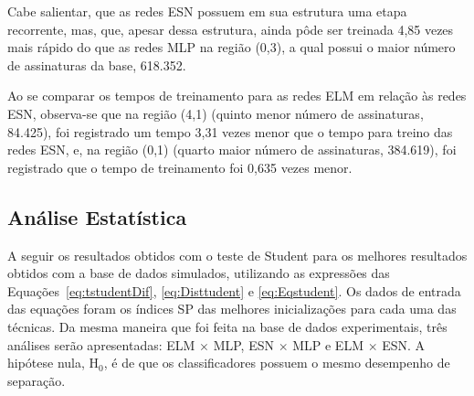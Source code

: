 Cabe salientar, que as redes ESN possuem em sua estrutura uma etapa recorrente, mas, que, apesar dessa estrutura, ainda pôde ser treinada 4,85 vezes mais rápido do que as redes MLP na região (0,3), a qual possui o maior número de assinaturas da base, 618.352.

%
%
%
%

Ao se comparar os tempos de treinamento para as redes ELM em relação às redes ESN, observa-se que na região (4,1) (quinto menor número de assinaturas, 84.425), foi registrado um tempo 3,31 vezes menor que o tempo para treino das redes ESN, e, na região (0,1) (quarto maior número de assinaturas, 384.619), foi registrado que o tempo de treinamento foi 0,635 vezes menor.

\subsection{Análise Estatística}



A seguir os resultados obtidos com o teste de Student para os melhores resultados obtidos com a base de dados simulados, utilizando as expressões das Equações~\ref{eq:tstudentDif}, \ref{eq:Disttudent} e \ref{eq:Eqstudent}. Os dados de entrada das equações foram os índices SP das melhores inicializações para cada uma das técnicas. Da mesma maneira que foi feita na base de dados experimentais, três análises serão apresentadas: ELM $\times$ MLP, ESN $\times$ MLP e ELM $\times$ ESN. A hipótese nula, H$_0$, é de que os classificadores possuem o mesmo desempenho de separação. 

